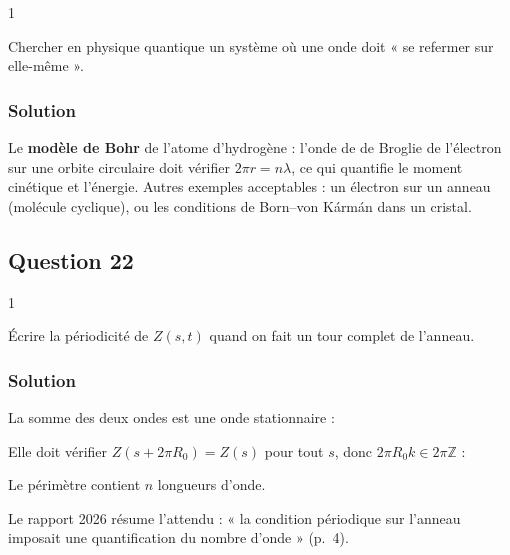 \documentclass[11pt,a4paper]{article}
\newcommand{\equationajustee}[1]{%
  \sbox{\boiteequation}{$\displaystyle #1$}%
  \ifdim\wd\boiteequation>\linewidth
    \[\resizebox{\linewidth}{!}{\usebox{\boiteequation}}\]%
  \else
    \[#1\]%
  \fi}
\begin{document}
\begin{indication}{1}

Chercher en physique quantique un système où une onde doit « se refermer sur elle-même ».

\end{indication}

\hypertarget{solution-20}{%
\subsubsection{Solution}\label{solution-20}}

Le \textbf{modèle de Bohr} de l'atome d'hydrogène : l'onde de de Broglie de l'électron sur une orbite circulaire doit vérifier \(2\pi r=n\lambda\), ce qui quantifie le moment cinétique et l'énergie. Autres exemples acceptables : un électron sur un anneau (molécule cyclique), ou les conditions de Born--von Kármán dans un cristal.

\hypertarget{question-22}{%
\subsection{Question 22}\label{question-22}}

\begin{indication}{1}

Écrire la périodicité de \(Z(s,t)\) quand on fait un tour complet de l'anneau.

\end{indication}

\hypertarget{solution-21}{%
\subsubsection{Solution}\label{solution-21}}

La somme des deux ondes est une onde stationnaire :

\equationajustee{Z=2a_Z\sin(ks)\cos(\omega t)}

Elle doit vérifier \(Z(s+2\pi R_0)=Z(s)\) pour tout \(s\), donc \(2\pi R_0k\in2\pi\mathbb{Z}\) :

\equationajustee{\boxed{k_n=\frac{n}{R_0},\ n\in{\mathbb{N}}^*}}

Le périmètre contient \(n\) longueurs d'onde.

\begin{jury}

Le rapport 2026 résume l'attendu : « la condition périodique sur l'anneau imposait une quantification du nombre d'onde » (p.~4).

\end{jury}
\end{document}
